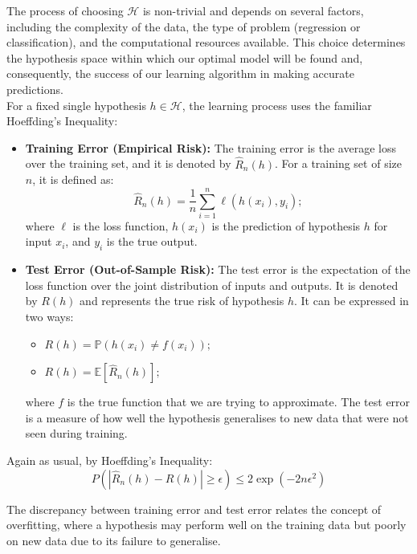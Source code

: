 The process of choosing \( \mathcal{H} \) is non-trivial and depends on several factors, including the complexity of the data, the type of problem (regression or classification), and the computational resources available. This choice determines the hypothesis space within which our optimal model will be found and, consequently, the success of our learning algorithm in making accurate predictions.\\

For a fixed single hypothesis $h \in \mathcal{H}$, the learning process uses the familiar Hoeffding's Inequality:

\begin{itemize}
    \item \textbf{Training Error (Empirical Risk):} The training error is the average loss over the training set, and it is denoted by \( \widehat{R}_n(h) \). For a training set of size \( n \), it is defined as:
    \[
    \widehat{R}_n(h) = \frac{1}{n} \sum_{i=1}^{n} \ell(h(x_i), y_i);
    \]
    where \( \ell \) is the loss function, \( h(x_i) \) is the prediction of hypothesis \( h \) for input \( x_i \), and \( y_i \) is the true output.

    \item \textbf{Test Error (Out-of-Sample Risk):} The test error is the expectation of the loss function over the joint distribution of inputs and outputs. It is denoted by \( R(h) \) and represents the true risk of hypothesis \( h \). It can be expressed in two ways:
    \begin{itemize}
        \item \( R(h) = \mathbb{P}(h(x_i) \neq f(x_i)); \)
        \item \( R(h) = \mathbb{E}[\widehat{R}_n(h)]; \)
    \end{itemize}
    where \( f \) is the true function that we are trying to approximate. The test error is a measure of how well the hypothesis generalises to new data that were not seen during training.
\end{itemize}

Again as usual, by Hoeffding's Inequality:
\[
P\left(\left|\widehat{R}_n(h) - R(h)\right| \geq \epsilon\right) \leq 2\exp\left(-2n\epsilon^2\right)
\]

The discrepancy between training error and test error relates the concept of overfitting, where a hypothesis may perform well on the training data but poorly on new data due to its failure to generalise.




